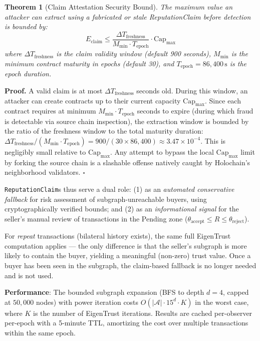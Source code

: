\documentclass[11pt]{article}
\newtheorem{theorem}{Theorem}[section]
\newcommand{\qed}{\hfill}
\newenvironment{proof}{\noindent\textbf{Proof.}}{\qed$\square$\par\medskip}
\begin{document}
\begin{theorem}[Claim Attestation Security Bound]\label{thm:claim_attestation}
The maximum value an attacker can extract using a fabricated or stale ReputationClaim before detection is bounded by:
\begin{equation}
    E_{\text{claim}} \leq \frac{\Delta T_{\text{freshness}}}{M_{\min} \cdot T_{\text{epoch}}} \cdot \text{Cap}_{\max}
\end{equation}
where $\Delta T_{\text{freshness}}$ is the claim validity window (default 900 seconds), $M_{\min}$ is the minimum contract maturity in epochs (default 30), and $T_{\text{epoch}} = 86{,}400\,\text{s}$ is the epoch duration.
\end{theorem}

\begin{proof}
A valid claim is at most $\Delta T_{\text{freshness}}$ seconds old. During this window, an attacker can create contracts up to their current capacity $\text{Cap}_{\max}$. Since each contract requires at minimum $M_{\min} \cdot T_{\text{epoch}}$ seconds to expire (during which fraud is detectable via source chain inspection), the extraction window is bounded by the ratio of the freshness window to the total maturity duration: $\Delta T_{\text{freshness}} / (M_{\min} \cdot T_{\text{epoch}}) = 900 / (30 \times 86{,}400) \approx 3.47 \times 10^{-4}$. This is negligibly small relative to $\text{Cap}_{\max}$. Any attempt to bypass the local $\text{Cap}_{\max}$ limit by forking the source chain is a slashable offense natively caught by Holochain's neighborhood validators. \qed
\end{proof}

\texttt{ReputationClaim}s thus serve a dual role: (1) as an \emph{automated conservative fallback} for risk assessment of subgraph-unreachable buyers, using cryptographically verified bounds; and (2) as an \emph{informational signal} for the seller's manual review of transactions in the Pending zone ($\theta_{\text{accept}} \leq R \leq \theta_{\text{reject}}$).

For \emph{repeat} transactions (bilateral history exists), the same full EigenTrust computation applies --- the only difference is that the seller's subgraph is more likely to contain the buyer, yielding a meaningful (non-zero) trust value. Once a buyer has been seen in the subgraph, the claim-based fallback is no longer needed and is not used.

\textbf{Performance}: The bounded subgraph expansion (BFS to depth $d=4$, capped at $50{,}000$ nodes) with power iteration costs $O(|\mathcal{A}| \cdot 15^d \cdot K)$ in the worst case, where $K$ is the number of EigenTrust iterations. Results are cached per-observer per-epoch with a 5-minute TTL, amortizing the cost over multiple transactions within the same epoch.
\end{document}
